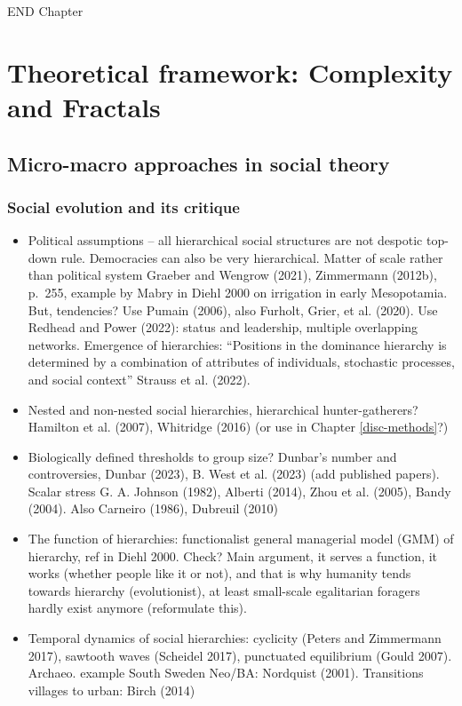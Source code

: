 \documentclass[
  12pt,
  a4paper, twoside]{book}
\begin{document}
END Chapter

\hypertarget{theory}{%
\chapter{Theoretical framework: Complexity and Fractals}\label{theory}}

\hypertarget{micro-macro-approaches-in-social-theory}{%
\section{Micro-macro approaches in social theory}\label{micro-macro-approaches-in-social-theory}}

\hypertarget{social-hierarchy}{%
\subsection{Social evolution and its critique}\label{social-hierarchy}}

\begin{itemize}
\item
  Political assumptions -- all hierarchical social structures are not despotic top-down rule. Democracies can also be very hierarchical. Matter of scale rather than political system Graeber and Wengrow (2021), Zimmermann (2012b), p.~255, example by Mabry in Diehl 2000 on irrigation in early Mesopotamia. But, tendencies? Use Pumain (2006), also Furholt, Grier, et al. (2020). Use Redhead and Power (2022): status and leadership, multiple overlapping networks. Emergence of hierarchies: ``Positions in the dominance hierarchy is determined by a combination of attributes of individuals, stochastic processes, and social context'' Strauss et al. (2022).
\item
  Nested and non-nested social hierarchies, hierarchical hunter-gatherers? Hamilton et al. (2007), Whitridge (2016) (or use in Chapter \ref{disc-methods}?)
\item
  Biologically defined thresholds to group size? Dunbar's number and controversies, Dunbar (2023), B. West et al. (2023) (add published papers). Scalar stress G. A. Johnson (1982), Alberti (2014), Zhou et al. (2005), Bandy (2004). Also Carneiro (1986), Dubreuil (2010)
\item
  The function of hierarchies: functionalist general managerial model (GMM) of hierarchy, ref in Diehl 2000. Check? Main argument, it serves a function, it works (whether people like it or not), and that is why humanity tends towards hierarchy (evolutionist), at least small-scale egalitarian foragers hardly exist anymore (reformulate this).
\item
  Temporal dynamics of social hierarchies: cyclicity (Peters and Zimmermann 2017), sawtooth waves (Scheidel 2017), punctuated equilibrium (Gould 2007). Archaeo. example South Sweden Neo/BA: Nordquist (2001). Transitions villages to urban: Birch (2014)
\end{itemize}
\end{document}
